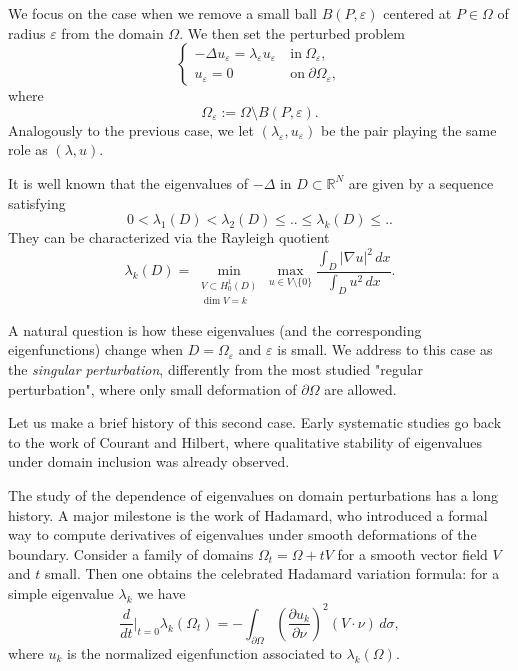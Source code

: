 \documentclass[11pt,reqno]{article}
\numberwithin{equation}{section}
\newcommand\R{\mathbb R}
\newcommand\e\varepsilon
\newcommand\la\lambda
\renewcommand\O\Omega
\begin{document}
    We focus on the case when we remove a small ball $B(P,\e)$ centered at $P\in\Omega$ of radius $\e$ from the domain $\O$. We then set the perturbed problem 
		\begin{equation}\label{eq:perturbedeigenvalueproblem}
			\begin{cases}
				-\Delta u_\e=\lambda_\e u_\e~&\mbox{in}\ \O_\e,\\
				u_\e=0~&\mbox{on}\ \partial\O_\e,
			\end{cases}
		\end{equation}
    where
    \begin{equation}\label{ome}
        \O_\e:=\O\setminus B(P,\e).
    \end{equation}
Analogously to the previous case, we let $(\lambda_\varepsilon, u_\varepsilon)$ be the pair playing the same role as $(\lambda, u)$.


    It is well known that the eigenvalues of $-\Delta$ in $D\subset\R^N$ are given by a sequence satisfying
    $$0<\la_1(D)<\la_2(D)\le..\le \la_k(D)\le..$$
They can be characterized via the Rayleigh quotient
\[
\lambda_k(D) = \min_{\substack{V \subset H_0^1(D) \\ \dim V = k}} \max_{u \in V \setminus \{0\}} 
\frac{\int_D |\nabla u|^2\,dx}{\int_D u^2\,dx}.
\]

 A natural question is how these eigenvalues (and the corresponding eigenfunctions) change when $D=\O_\e$ and $\e$ is small. We address to this case as the {\em singular perturbation}, differently from the most studied "regular perturbation", where only small deformation of $\partial\Omega$ are allowed.

Let us make a brief history of this second case.
Early systematic studies go back to the work of Courant and Hilbert, where qualitative stability of eigenvalues under domain inclusion was already observed.

The study of the dependence of eigenvalues on domain perturbations has a long history. A major milestone is the work of Hadamard, who introduced a formal way to compute derivatives of eigenvalues under smooth deformations of the boundary. Consider a family of domains $\Omega_t=\O+tV$ for a smooth vector field $V$ and $t$ small. Then one obtains the celebrated Hadamard variation formula: for a simple eigenvalue $\la_k$ we have
\[
\frac{d}{dt}\bigg|_{t=0} \lambda_k(\Omega_t)
=
- \int_{\partial \Omega} \left(\frac{\partial u_k}{\partial \nu}\right)^2 (V \cdot \nu)\, d\sigma,
\]
where $u_k$ is the normalized eigenfunction associated to $\lambda_k(\Omega)$.
\end{document}

